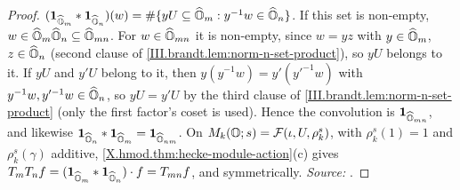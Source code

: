 \begin{theorem}[multiplicativity]
\end{theorem}
\begin{proof}
$(\mathbf 1_{\widehat{\mathbb{O}}_m}*\mathbf 1_{\widehat{\mathbb{O}}_n})(w)=\#\{yU\subseteq\widehat{\mathbb{O}}_m:y^{-1}w\in\widehat{\mathbb{O}}_n\}$. If this set is non-empty, $w\in\widehat{\mathbb{O}}_m\widehat{\mathbb{O}}_n\subseteq\widehat{\mathbb{O}}_{mn}$. For
$w\in\widehat{\mathbb{O}}_{mn}$ it is non-empty, since $w=yz$ with $y\in\widehat{\mathbb{O}}_m$, $z\in\widehat{\mathbb{O}}_n$ (second clause of \cref{III.brandt.lem:norm-n-set-product}),
so $yU$ belongs to it. If $yU$ and $y'U$ belong to it, then $y(y^{-1}w)=y'(y'^{-1}w)$ with $y^{-1}w,y'^{-1}w\in\widehat{\mathbb{O}}_n$, so $yU=y'U$ by the third
clause of \cref{III.brandt.lem:norm-n-set-product} (only the first factor's coset is used). Hence the convolution is $\mathbf 1_{\widehat{\mathbb{O}}_{mn}}$, and likewise $\mathbf 1_{\widehat{\mathbb{O}}_n}*\mathbf 1_{\widehat{\mathbb{O}}_m}=\mathbf 1_{\widehat{\mathbb{O}}_{nm}}$.
On $M_k(\mathbb{O};s)=\mathcal F(\iota,U,\rho_k^s)$, with $\rho_k^s(1)=1$ and $\rho_k^s(\gamma)$ additive, \cref{X.hmod.thm:hecke-module-action}(c) gives
$T_mT_nf=(\mathbf 1_{\widehat{\mathbb{O}}_m}*\mathbf 1_{\widehat{\mathbb{O}}_n})\cdot f=T_{mn}f$, and symmetrically. \emph{Source:} \cite[Prop.~1.1]{Shz}.
\end{proof}

\begin{definition}
\end{definition}

